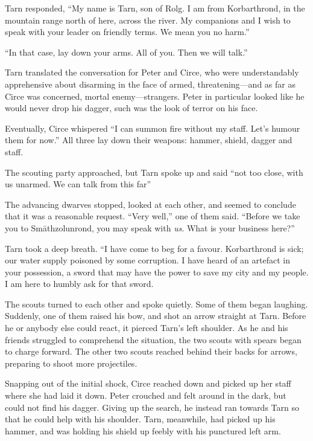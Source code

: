 Tarn responded, ``My name is Tarn, son of Rolg.  I am from Korbarthrond, in the mountain range north of here, across the river.  My companions and I wish to speak with your leader on friendly terms.  We mean you no harm.''

``In that case, lay down your arms.  All of you.  Then we will talk.''

Tarn translated the conversation for Peter and Circe, who were understandably apprehensive about disarming in the face of armed, threatening---and as far as Circe was concerned, mortal enemy---strangers.  Peter in particular looked like he would never drop his dagger, such was the look of terror on his face.

Eventually, Circe whispered ``I can summon fire without my staff.  Let's humour them for now.''  All three lay down their weapons: hammer, shield, dagger and staff.

The scouting party approached, but Tarn spoke up and said ``not too close, with us unarmed.  We can talk from this far''

The advancing dwarves stopped, looked at each other, and seemed to conclude that it was a reasonable request.  ``Very well,'' one of them said.  ``Before we take you to Sm\=athzolunrond, you may speak with \emph{us}.  What is your business here?''

Tarn took a deep breath.  ``I have come to beg for a favour.  Korbarthrond is sick; our water supply poisoned by some corruption.  I have heard of an artefact in your possession, a sword that may have the power to save my city and my people.  I am here to humbly ask for that sword.

The scouts turned to each other and spoke quietly.  Some of them began laughing.  Suddenly, one of them raised his bow, and shot an arrow straight at Tarn.  Before he or anybody else could react, it pierced Tarn's left shoulder.  As he and his friends struggled to comprehend the situation, the two scouts with spears began to charge forward.  The other two scouts reached behind their backs for arrows, preparing to shoot more projectiles.

Snapping out of the initial shock, Circe reached down and picked up her staff where she had laid it down.  Peter crouched and felt around in the dark, but could not find his dagger.  Giving up the search, he instead ran towards Tarn so that he could help with his shoulder.  Tarn, meanwhile, had picked up his hammer, and was holding his shield up feebly with his punctured left arm.


